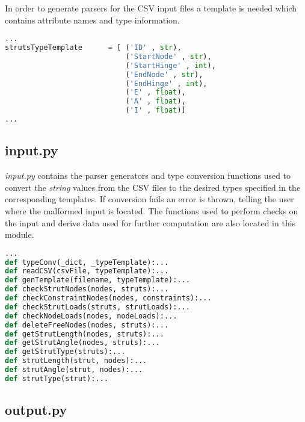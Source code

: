 In order to generate parsers for the CSV input files a template is needed which contains attribute names and type information.

\begin{inconsolata}
\begin{lstlisting}[language=python]
...
strutsTypeTemplate      = [ ('ID' , str),
                            ('StartNode' , str),
                            ('StartHinge' , int),
                            ('EndNode' , str),
                            ('EndHinge' , int),
                            ('E' , float),
                            ('A' , float),
                            ('I' , float)]
...
\end{lstlisting}
\end{inconsolata}

\subsection{input.py}
\label{subsec:input.py}

\textit{input.py} contains the parser generators and type conversion functions used to convert the \textit{string} values from the CSV files to the desired types specified in the corresponding templates.
If conversion fails an error is thrown, telling the user where the malformed input is located.
The functions used to perform checks on the input and derive data used for further computation are also located in this module.

\begin{inconsolata}
\begin{lstlisting}[language=python]
...
def typeConv(_dict, _typeTemplate):...
def readCSV(csvFile, typeTemplate):...
def genTemplate(filename, typeTemplate):...
def checkStrutNodes(nodes, struts):...
def checkConstraintNodes(nodes, constraints):...
def checkStrutLoads(struts, strutLoads):...
def checkNodeLoads(nodes, nodeLoads):...
def deleteFreeNodes(nodes, struts):...
def getStrutLength(nodes, struts):...
def getStrutAngle(nodes, struts):...
def getStrutType(struts):...
def strutLength(strut, nodes):...
def strutAngle(strut, nodes):...
def strutType(strut):...
\end{lstlisting}
\end{inconsolata}

\subsection{output.py}
\label{subsec:output.py}


